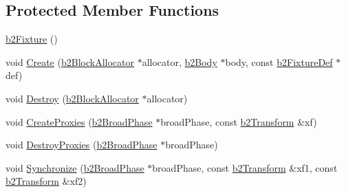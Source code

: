 \subsection*{Protected Member Functions}
\begin{DoxyCompactItemize}
\item 
\mbox{\hyperlink{classb2_fixture_a02e11d3783af2168ac1cf8e9e9055c67}{b2\+Fixture}} ()
\item 
void \mbox{\hyperlink{classb2_fixture_a1f465f3656f098eebfcbc6edf7a9239a}{Create}} (\mbox{\hyperlink{classb2_block_allocator}{b2\+Block\+Allocator}} $\ast$allocator, \mbox{\hyperlink{classb2_body}{b2\+Body}} $\ast$body, const \mbox{\hyperlink{structb2_fixture_def}{b2\+Fixture\+Def}} $\ast$def)
\item 
void \mbox{\hyperlink{classb2_fixture_a279301181668f724c027020a654efe42}{Destroy}} (\mbox{\hyperlink{classb2_block_allocator}{b2\+Block\+Allocator}} $\ast$allocator)
\item 
void \mbox{\hyperlink{classb2_fixture_a670f1f687521666da6e92885754970b7}{Create\+Proxies}} (\mbox{\hyperlink{classb2_broad_phase}{b2\+Broad\+Phase}} $\ast$broad\+Phase, const \mbox{\hyperlink{structb2_transform}{b2\+Transform}} \&xf)
\item 
void \mbox{\hyperlink{classb2_fixture_a1def068c9ce09e2ebcccc556951b7979}{Destroy\+Proxies}} (\mbox{\hyperlink{classb2_broad_phase}{b2\+Broad\+Phase}} $\ast$broad\+Phase)
\item 
void \mbox{\hyperlink{classb2_fixture_ac8fd15bfd9a3a7ba05f3831e6f598908}{Synchronize}} (\mbox{\hyperlink{classb2_broad_phase}{b2\+Broad\+Phase}} $\ast$broad\+Phase, const \mbox{\hyperlink{structb2_transform}{b2\+Transform}} \&xf1, const \mbox{\hyperlink{structb2_transform}{b2\+Transform}} \&xf2)
\end{DoxyCompactItemize}
